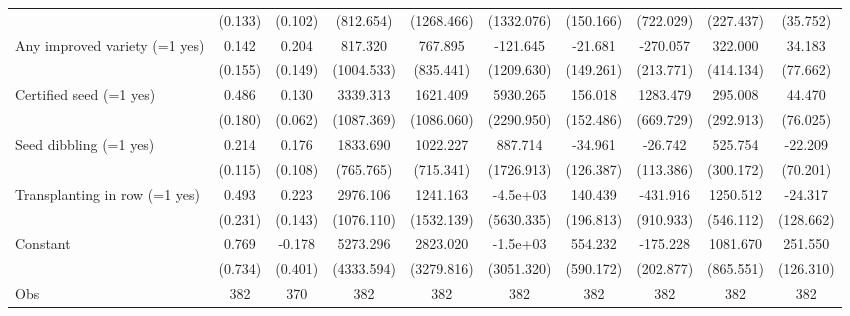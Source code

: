 {\begin{tabular}{l*{9}{c}}
                    &(0.133)         &(0.102)         &(812.654)         &(1268.466)         &(1332.076)         &(150.166)         &(722.029)         &(227.437)         &(35.752)         \\
Any improved variety (=1 yes)&0.142         &0.204         &817.320         &767.895         &-121.645         &-21.681         &-270.057         &322.000         &34.183         \\
                    &(0.155)         &(0.149)         &(1004.533)         &(835.441)         &(1209.630)         &(149.261)         &(213.771)         &(414.134)         &(77.662)         \\
Certified seed (=1 yes)&0.486\sym{**} &0.130\sym{*}  &3339.313\sym{**} &1621.409         &5930.265\sym{**} &156.018         &1283.479\sym{*}  &295.008         &44.470         \\
                    &(0.180)         &(0.062)         &(1087.369)         &(1086.060)         &(2290.950)         &(152.486)         &(669.729)         &(292.913)         &(76.025)         \\
Seed dibbling (=1 yes)&0.214         &0.176         &1833.690\sym{**} &1022.227         &887.714         &-34.961         &-26.742         &525.754         &-22.209         \\
                    &(0.115)         &(0.108)         &(765.765)         &(715.341)         &(1726.913)         &(126.387)         &(113.386)         &(300.172)         &(70.201)         \\
Transplanting in row (=1 yes)&0.493\sym{*}  &0.223         &2976.106\sym{**} &1241.163         &-4.5e+03         &140.439         &-431.916         &1250.512\sym{*}  &-24.317         \\
                    &(0.231)         &(0.143)         &(1076.110)         &(1532.139)         &(5630.335)         &(196.813)         &(910.933)         &(546.112)         &(128.662)         \\
Constant            &0.769         &-0.178         &5273.296         &2823.020         &-1.5e+03         &554.232         &-175.228         &1081.670         &251.550\sym{*}  \\
                    &(0.734)         &(0.401)         &(4333.594)         &(3279.816)         &(3051.320)         &(590.172)         &(202.877)         &(865.551)         &(126.310)         \\
\hline
Obs                 &  382         &  370         &  382         &  382         &  382         &  382         &  382         &  382         &  382         \\
\hline\hline
\end{tabular}
}
